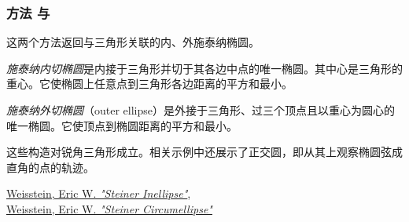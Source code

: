 \subsubsection{方法  与 } %
\label{ssub:steiner_inellipse_and_circumellipse}

这两个方法返回与三角形关联的内、外施泰纳椭圆。

\medskip

\emph{施泰纳内切椭圆}是内接于三角形并切于其各边中点的唯一椭圆。其中心是三角形的重心。它使椭圆上任意点到三角形各边距离的平方和最小。

\medskip

\emph{施泰纳外切椭圆}（outer ellipse）是外接于三角形、过三个顶点且以重心为圆心的唯一椭圆。它使顶点到椭圆距离的平方和最小。

\medskip

这些构造对锐角三角形成立。相关示例中还展示了正交圆，即从其上观察椭圆弦成直角的点的轨迹。
\begin{flushright}
\small
\href{[URL1]}{Weisstein, Eric W. \emph{"Steiner Inellipse"}},\\
\href{[URL1]}{Weisstein, Eric W. \emph{"Steiner Circumellipse"}}
\end{flushright}

\vspace{1em}

